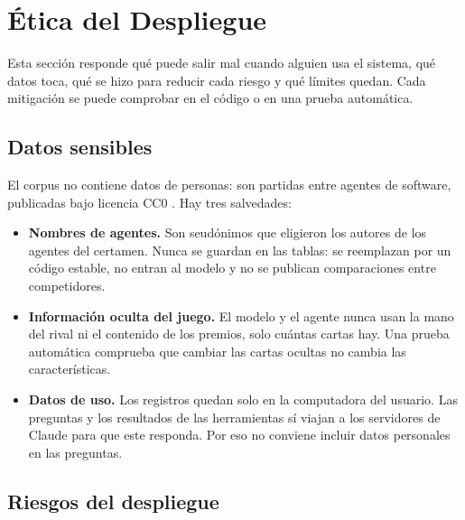 %
\section{Ética del Despliegue}
\label{sec:etica}

Esta sección responde qué puede salir mal cuando alguien usa el sistema,
qué datos toca, qué se hizo para reducir cada riesgo y qué límites quedan.
Cada mitigación se puede comprobar en el código o en una prueba automática.

\subsection{Datos sensibles}
\label{subsec:sensibilidad}

El corpus no contiene datos de personas: son partidas entre agentes de
software, publicadas bajo licencia CC0 \cite{ptcg_dataset_2026}. Hay tres
salvedades:
\begin{itemize}
  \item \textbf{Nombres de agentes.} Son seudónimos que eligieron los
        autores de los agentes del certamen. Nunca se guardan en las tablas:
        se reemplazan por un código estable, no entran al modelo y no se
        publican comparaciones entre competidores.
  \item \textbf{Información oculta del juego.} El modelo y el agente nunca
        usan la mano del rival ni el contenido de los premios, solo cuántas
        cartas hay. Una prueba automática comprueba que cambiar las cartas
        ocultas no cambia las características.
  \item \textbf{Datos de uso.} Los registros quedan solo en la computadora
        del usuario. Las preguntas y los resultados de las herramientas sí
        viajan a los servidores de Claude para que este responda. Por eso no
        conviene incluir datos personales en las preguntas.
\end{itemize}

\subsection{Riesgos del despliegue}
\label{subsec:riesgosdespliegue}

